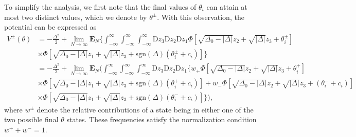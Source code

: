 \documentclass[reprint,amsmath,amssymb,aps]{revtex4-2}
\begin{document}
To simplify the analysis, we first note that the final values of $\theta_i$ can attain at most two distinct values, which we denote by $\theta^\pm$. With this observation, the potential can be expressed as
\begin{align*}
    V^\pm(\theta)
    &=
    -\frac{\Delta^2}{2}+ 
    \lim_{N\to\infty} \mathbf{E}_{N} \Bigg\{
    \int_{-\infty}^{\infty}\int_{-\infty}^{\infty}\int_{-\infty}^{\infty}
    \mathrm{D}z_3 \mathrm{D}z_2 \mathrm{D}z_1
    \Phi\left[ \sqrt{\Delta_0 - |\Delta|} z_2 + \sqrt{|\Delta|}z_3 + \theta_i^\pm \right]
    \\
    &\times
    \Phi\left[ \sqrt{\Delta_0 - |\Delta|} z_1 + \sqrt{|\Delta|}z_3 + \mathrm{sgn}(\Delta) (\theta_i^\pm +c_i)\right]\Bigg\} \\
    &=
    -\frac{\Delta^2}{2}+ 
    \lim_{N\to\infty} \mathbf{E}_{N} \Bigg(
    \int_{-\infty}^{\infty}\int_{-\infty}^{\infty}\int_{-\infty}^{\infty}
    \mathrm{D}z_3 \mathrm{D}z_2 \mathrm{D}z_1
    \Bigg\{
    w_+
    \Phi\left[ \sqrt{\Delta_0 - |\Delta|} z_2 + \sqrt{|\Delta|}z_3 + \theta_i^+ \right]
    \\
    &\times
    \Phi\left[ \sqrt{\Delta_0 - |\Delta|} z_1 + \sqrt{|\Delta|}z_3 + \mathrm{sgn}(\Delta) (\theta_i^+ +c_i)\right]
    +
    w_-
    \Phi\left[ \sqrt{\Delta_0 - |\Delta|} z_2 + \sqrt{|\Delta|}z_3 + (\theta_i^- +c_i) \right]
    \\
    &\times
    \Phi\left[ \sqrt{\Delta_0 - |\Delta|} z_1 + \sqrt{|\Delta|}z_3 + \mathrm{sgn}(\Delta) (\theta_i^-+c_i) \right]
    \Bigg\}\Bigg),
\end{align*}
where $w^\pm$ denote the relative contributions of a state being in either one of the two possible final $\theta$ states. These frequencies satisfy the normalization condition $w^+ + w^- = 1$.
\end{document}
